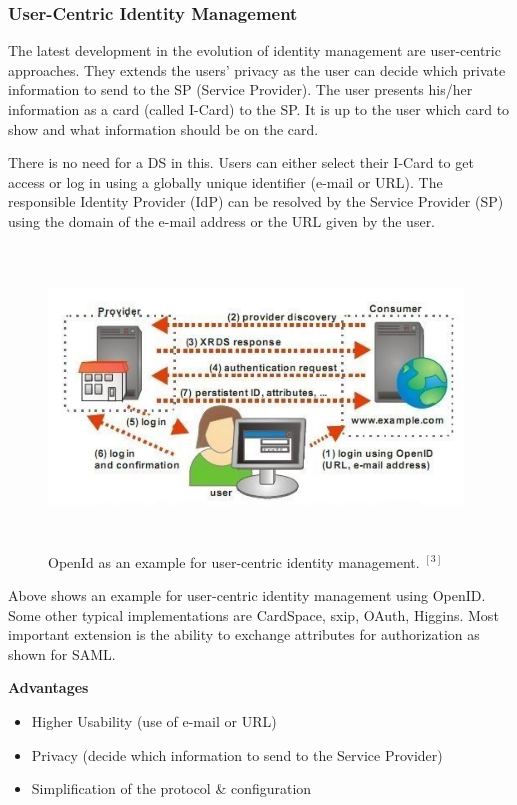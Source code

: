 \documentclass[12pt]{report}
\begin{document}
	\subsubsection{User-Centric Identity Management}
	The latest development in the evolution of identity management are user-centric approaches. They extends the users’ privacy as the user can decide which private information to send to the SP (Service Provider). The user presents his/her information as a card (called I-Card) to the SP. It is up to the user which card to show and what information should be on the card.\newline
	
	There is no need for a DS in this. Users can either select their I-Card to get access or log in using a globally unique identifier (e-mail or URL).  The responsible Identity Provider (IdP) can be resolved by the Service Provider (SP) using the domain of the e-mail address or the URL given by the user.
	\begin{figure}[H]
	\begin{center}
	\includegraphics[width=11cm,height=8cm]{./3-2.jpg}
	\caption{ OpenId as an example for user-centric identity management. $ ^{[3]}$\label{fig:OpenId as an example for user-centric identity management . }}
	\end{center}
	\end{figure}
	Above shows an example for user-centric identity management using OpenID. Some other typical implementations are CardSpace, sxip, OAuth, Higgins. Most important extension is the ability to exchange attributes for authorization as shown for SAML.\newline
	
	\textbf{Advantages}
	\begin{itemize}
	\item Higher Usability (use of e-mail or URL)
	\item Privacy (decide which information to send to the Service Provider)
	\item Simplification of the protocol \& configuration
	\end{itemize}
	
\end{document}
